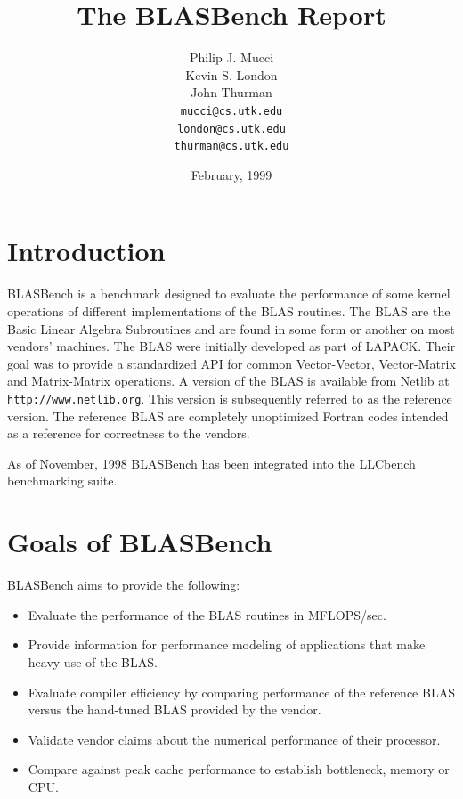\documentclass [12pt]{article}
\begin{document}
\title{The BLASBench Report}
\author {Philip J. Mucci \\
	Kevin S. London \\
	John Thurman \\
        {\tt mucci@cs.utk.edu} \\
	{\tt london@cs.utk.edu} \\
	{\tt thurman@cs.utk.edu}}
\date{February, 1999}

\maketitle

\section{Introduction}

BLASBench is a benchmark designed to evaluate the performance of some
kernel operations of different implementations of the BLAS
routines. The BLAS are the Basic Linear Algebra Subroutines and are
found in some form or another on most vendors' machines. The BLAS were
initially developed as part of LAPACK. Their goal was to provide a
standardized API for common Vector-Vector, Vector-Matrix and
Matrix-Matrix operations. A version of the BLAS is
available from Netlib at {\tt http://www.netlib.org}. This version is
subsequently referred to as the reference version. The reference BLAS
are completely unoptimized Fortran codes intended as a reference for
correctness to the vendors.

As of November, 1998 BLASBench has been integrated into the LLCbench benchmarking suite.

\section{Goals of BLASBench}

BLASBench aims to provide the following:

\begin{itemize}
\item Evaluate the performance of the BLAS routines in MFLOPS/sec.
\item Provide
information for performance modeling of applications that make heavy
use of the BLAS.
\item  Evaluate compiler efficiency by comparing
performance of the reference BLAS versus the hand-tuned BLAS provided
by the vendor.
\item Validate vendor claims about the numerical performance 
of their processor.
\item Compare against peak cache performance to establish bottleneck, memory
or CPU.
\end{itemize}
\end{document}
